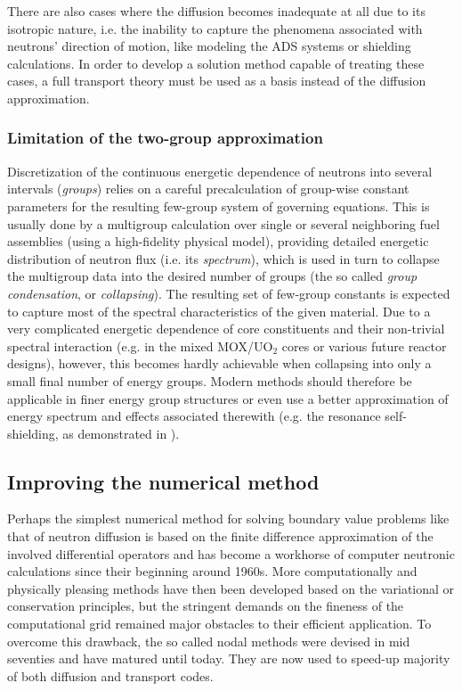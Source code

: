 There are also cases where the diffusion becomes inadequate at all due to its isotropic nature, i.e. the inability to
capture the phenomena associated with neutrons' direction of motion, like modeling the
ADS systems or shielding calculations.
In order to develop a solution method capable of treating these cases, a full transport theory must be used as a basis
instead of the diffusion approximation.

\subsubsection{Limitation of the two-group approximation}
Discretization of the continuous energetic dependence of neutrons into several intervals (\textit{groups}) relies on a
careful precalculation of group-wise constant parameters for the resulting few-group system of governing equations. This
is usually done by a multigroup calculation over single or several neighboring fuel assemblies (using a high-fidelity
physical model), providing detailed energetic distribution of neutron flux (i.e. its \textit{spectrum}), which is used
in turn to collapse the multigroup data into the desired number of groups (the so called \textit{group condensation}, or
\textit{collapsing}). The resulting set of few-group constants is expected to capture most of the spectral
characteristics of the given material. Due to a very complicated energetic dependence of core constituents and their
non-trivial spectral interaction (e.g. in the mixed MOX/UO$_2$ cores or various future reactor designs), however, this
becomes hardly achievable when collapsing into only a small final number of energy groups. Modern methods should
therefore be applicable in finer energy group structures or even use a better approximation of energy spectrum and
effects associated therewith (e.g. the resonance self-shielding, as demonstrated in \cite{bib:DownarARSM}).

\subsection{Improving the numerical method}
Perhaps the simplest numerical method for solving boundary value problems like that of neutron diffusion is based on the
finite difference approximation of the involved differential operators and has become a workhorse of computer neutronic
calculations since their beginning around 1960s. More computationally and physically pleasing methods have then been
developed based on the variational or conservation principles, but the stringent demands on the fineness of the
computational grid remained major obstacles to their efficient application. To overcome this drawback, the so called
nodal methods were devised in mid seventies and have matured until today. They are now used to speed-up majority of both
diffusion and transport codes.

